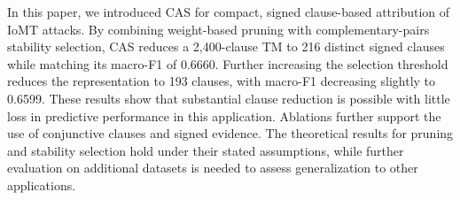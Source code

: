\documentclass[conference]{IEEEtran}
\begin{document}
In this paper, we introduced CAS for compact, signed clause-based attribution of IoMT attacks. By combining weight-based pruning with complementary-pairs stability selection, CAS reduces a 2,400-clause TM to 216 distinct signed clauses while matching its macro-F1 of 0.6660. Further increasing the selection threshold reduces the representation to 193 clauses, with macro-F1 decreasing slightly to 0.6599. These results show that substantial clause reduction is possible with little loss in predictive performance in this application. Ablations further support the use of conjunctive clauses and signed evidence. The theoretical results for pruning and stability selection hold under their stated assumptions, while further evaluation on additional datasets is needed to assess generalization to other applications.




\end{document}
